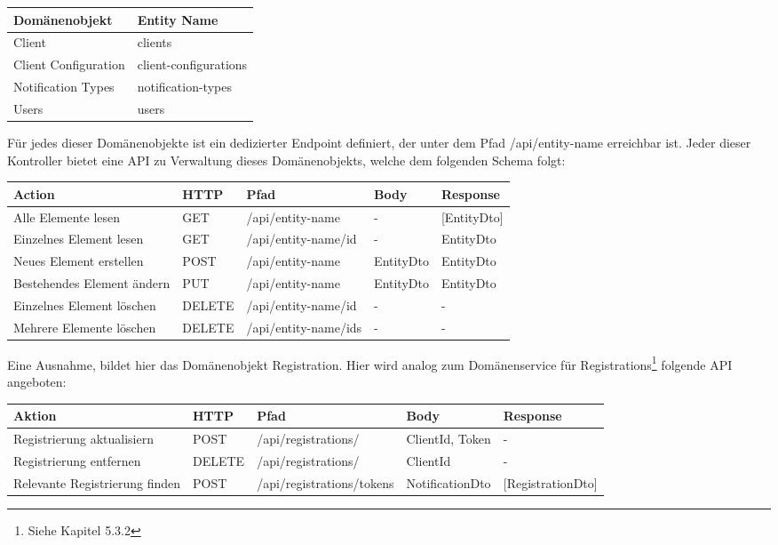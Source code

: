 \begin{table}[h]
    \centering
    \begin{tabular}{|l|p{13cm}|}
        \hline
        \textbf{Domänenobjekt} & \textbf{Entity Name} \\
        \hline
        Client         & clients \\
        \hline
        Client Configuration         & client-configurations \\
        \hline
        Notification Types         & notification-types \\
        \hline
        Users         & users \\
        \hline
    \end{tabular}\label{tab:adminapimethods}
\end{table}

Für jedes dieser Domänenobjekte ist ein dedizierter Endpoint definiert, der unter dem Pfad /api/entity-name erreichbar ist.
Jeder dieser Kontroller bietet eine API zu Verwaltung dieses Domänenobjekts, welche dem folgenden Schema folgt:

\begin{tabular}{|p{7.3cm}|l|l|l|l|}
    \hline
    \textbf{Action} & \textbf{HTTP} & \textbf{Pfad} & \textbf{Body} & \textbf{Response} \\
    \hline
        Alle Elemente lesen         & GET & /api/entity-name & - & [EntityDto] \\
    \hline
        Einzelnes Element lesen         & GET & /api/entity-name/id & - & EntityDto \\
    \hline
        Neues Element erstellen         & POST & /api/entity-name  & EntityDto & EntityDto\\
    \hline
        Bestehendes Element ändern          & PUT & /api/entity-name  & EntityDto & EntityDto\\
    \hline
        Einzelnes Element löschen          & DELETE & /api/entity-name/id  & - & -  \\
    \hline
        Mehrere Elemente löschen          & DELETE & /api/entity-name/ids  & - & - \\
    \hline
\end{tabular}\label{tab:apimethods}

Eine Ausnahme, bildet hier das Domänenobjekt Registration.
Hier wird analog zum Domänenservice für Registrations\footnote{Siehe Kapitel 5.3.2} folgende API angeboten:

\begin{tabular}{|l|l|l|l|l|}
    \hline
    \textbf{Aktion} & \textbf{HTTP} & \textbf{Pfad} & \textbf{Body} & \textbf{Response} \\
    \hline
    Registrierung aktualisiern         & POST & /api/registrations/ & ClientId, Token & - \\
    \hline
    Registrierung entfernen         & DELETE & /api/registrations/ & ClientId & - \\
    \hline
    Relevante Registrierung finden         & POST & /api/registrations/tokens & NotificationDto & [RegistrationDto] \\
    \hline
\end{tabular}\label{tab:registrationsapimethods}

